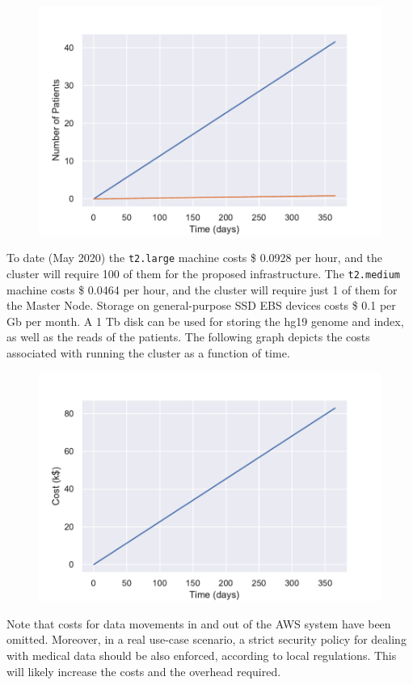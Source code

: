 \documentclass{article}
\begin{document}
\begin{figure}[!h]
    \center
    \includegraphics[width=.8\textwidth]{./images/patient_graph.pdf}
\end{figure}
\FloatBarrier

To date (May 2020) the \texttt{t2.large} machine costs \$ 0.0928 per hour, and the cluster will require 100 of them for the proposed infrastructure.
The \texttt{t2.medium} machine costs \$ 0.0464 per hour, and the cluster will require just 1 of them for the Master Node.
Storage on general-purpose SSD EBS devices costs \$ 0.1 per Gb per month.
A 1 Tb disk can be used for storing the hg19 genome and index, as well as the reads of the patients.
The following graph depicts the costs associated with running the cluster as a function of time.

\begin{figure}[!h]
    \center
    \includegraphics[width=.8\textwidth]{./images/cost_graph.pdf}
\end{figure}

\FloatBarrier

Note that costs for data movements in and out of the AWS system have been omitted.
Moreover, in a real use-case scenario, a strict security policy for dealing with medical data should be also enforced, according to local regulations.
This will likely increase the costs and the overhead required.
\end{document}
